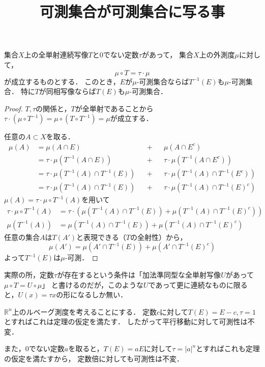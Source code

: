 \documentclass[a4j]{jarticle}
\title{可測集合が可測集合に写る事}
\begin{document}
\maketitle

\begin{Them}
    集合$X$上の全単射連続写像$T$と0でない定数$\tau$があって，
    集合$X$上の外測度$\mu$に対して，
    \[ \mu \circ T=\tau \cdot \mu \]
    が成立するものとする．
    このとき，$E$が$\mu$-可測集合ならば$T^{-1}(E)$も$\mu$-可測集合．
    特に$T$が同相写像ならば$T(E)$も$\mu$-可測集合．
\end{Them}
\begin{proof}
    $T,\tau$の関係と，$T$が全単射であることから
    $\tau \cdot (\mu \circ T^{-1})=\mu \circ (T \circ T^{-1})=\mu$が成立する．

    任意の$A \subset X$を取る．
    \begin{align*}
        \mu(A)
        &=\mu(A \cap E)                              &&+&&   \mu(A \cap E^c) \\
        &=\tau \cdot \mu(T^{-1}(A \cap E))           &&+&&   \tau \cdot \mu(T^{-1}(A \cap E^c)) \\
        &=\tau \cdot \mu(T^{-1}(A) \cap T^{-1}(E))   &&+&&   \tau \cdot \mu(T^{-1}(A) \cap T^{-1}(E^c)) \\
        &=\tau \cdot \mu(T^{-1}(A) \cap T^{-1}(E))   &&+&&   \tau \cdot \mu(T^{-1}(A) \cap T^{-1}(E)^c)
    \end{align*}
    $\mu(A)=\tau \cdot \mu \circ T^{-1}(A)$を用いて
    \begin{align*}
        \tau \cdot \mu \circ T^{-1}(A)&=\tau \cdot (\mu(T^{-1}(A) \cap T^{-1}(E))+\mu(T^{-1}(A) \cap T^{-1}(E)^c)) \\
        \mu(T^{-1}(A))&=\mu(T^{-1}(A) \cap T^{-1}(E))+\mu(T^{-1}(A) \cap T^{-1}(E)^c)
    \end{align*}
    任意の集合$A$は$T(A')$と表現できる（$T$の全射性）から，
    \[ \mu(A')=\mu(A' \cap T^{-1}(E))+\mu(A' \cap T^{-1}(E)^c) \]
    よって$T^{-1}(E)$は$\mu$-可測．
\end{proof}
実際の所，定数$\tau$が存在するという条件は「加法準同型な全単射写像$U$があって$\mu \circ T=U \circ \mu$」
と書けるのだが，このような$U$であって更に連続なものに限ると，$U(x)=\tau x$の形になるしか無い．

\begin{Example}
    $\mathbb{R}^n$上のルベーグ測度を考えることにする．
    定数$c$に対して$T(E)=E-c, \tau=1$とすればこれは定理の仮定を満たす．
    したがって平行移動に対して可測性は不変．

    また，0でない定数$a$を取ると，$T(E)=aE$に対して$\tau=|a|^n$とすればこれも定理の仮定を満たすから，
    定数倍に対しても可測性は不変．
\end{Example}
\end{document}
